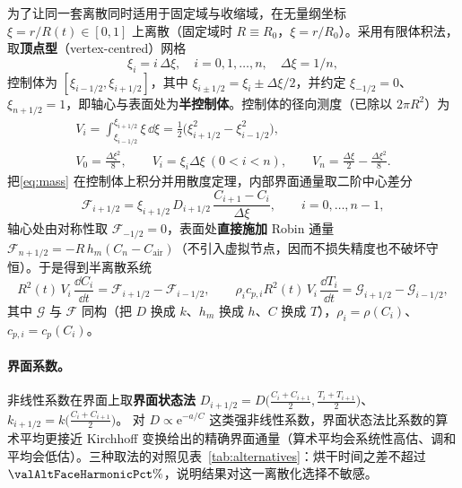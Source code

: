为了让同一套离散同时适用于固定域与收缩域，在无量纲坐标 $\xi=r/R(t)\in[0,1]$ 上离散（固定域时 $R\equiv R_0$，$\xi=r/R_0$）。采用有限体积法\cite{patankar1980,quarteroni2007}，取\textbf{顶点型}（vertex-centred）网格
\[\xi_i=i\,\Delta\xi,\quad i=0,1,\dots,n,\quad \Delta\xi=1/n,\]
控制体为 $[\xi_{i-1/2},\xi_{i+1/2}]$，其中 $\xi_{i\pm1/2}=\xi_i\pm\Delta\xi/2$，并约定 $\xi_{-1/2}=0$、$\xi_{n+1/2}=1$，即轴心与表面处为\textbf{半控制体}。控制体的径向测度（已除以 $2\pi R^2$）为
\begin{equation}
\begin{gathered}
V_i=\int_{\xi_{i-1/2}}^{\xi_{i+1/2}}\!\xi\,\dd\xi=\tfrac12\bigl(\xi_{i+1/2}^2-\xi_{i-1/2}^2\bigr),
\\[-2pt]
 V_0=\tfrac{\Delta\xi^2}{8},\qquad V_i=\xi_i\Delta\xi\ (0<i<n),\qquad V_n=\tfrac{\Delta\xi}{2}-\tfrac{\Delta\xi^2}{8}.
\end{gathered}
\label{eq:volumes}
\end{equation}
把\eqref{eq:mass} 在控制体上积分并用散度定理，内部界面通量取二阶中心差分
\begin{equation}
\mathcal F_{i+1/2}=\xi_{i+1/2}\,D_{i+1/2}\,\frac{C_{i+1}-C_i}{\Delta\xi},\qquad i=0,\dots,n-1,
\label{eq:flux}
\end{equation}
轴心处由对称性取 $\mathcal F_{-1/2}=0$，表面处\textbf{直接施加} Robin 通量 $\mathcal F_{n+1/2}=-R\,h_m(C_n-C_{\mathrm{air}})$（不引入虚拟节点，因而不损失精度也不破坏守恒）。于是得到半离散系统
\begin{equation}
R^2(t)\,V_i\,\frac{\dd C_i}{\dd t}=\mathcal F_{i+1/2}-\mathcal F_{i-1/2},\qquad
\rho_ic_{p,i}R^2(t)\,V_i\,\frac{\dd T_i}{\dd t}=\mathcal G_{i+1/2}-\mathcal G_{i-1/2},
\label{eq:semidiscrete}
\end{equation}
其中 $\mathcal G$ 与 $\mathcal F$ 同构（把 $D$ 换成 $k$、$h_m$ 换成 $h$、$C$ 换成 $T$），$\rho_i=\rho(C_i)$、$c_{p,i}=c_p(C_i)$。

\paragraph{界面系数。} 非线性系数在界面上取\textbf{界面状态法}
$D_{i+1/2}=D\bigl(\tfrac{C_i+C_{i+1}}2,\tfrac{T_i+T_{i+1}}2\bigr)$、$k_{i+1/2}=k\bigl(\tfrac{C_i+C_{i+1}}2\bigr)$。
对 $D\propto\mathrm{e}^{-a/C}$ 这类强非线性系数，界面状态法比系数的算术平均更接近 Kirchhoff 变换给出的精确界面通量（算术平均会系统性高估、调和平均会低估）。三种取法的对照见表~\ref{tab:alternatives}：烘干时间之差不超过 $\valAltFaceHarmonicPct\%$，说明结果对这一离散化选择不敏感。

